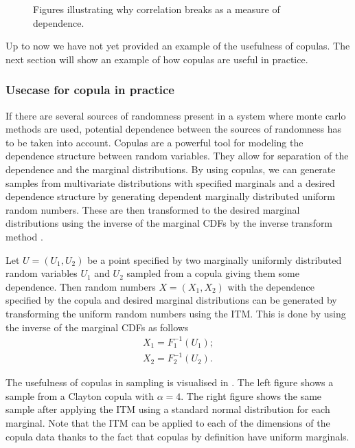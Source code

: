 \begin{figure}
\begin{minipage}{0.25\textwidth}
        \label{fig:exponentialDependenceScatterRet}
    \end{minipage}
    \caption{Figures illustrating why correlation breaks as a measure of dependence.}
    \label{fig:ExamplePlots}
\end{figure}

Up to now we have not yet provided an example of the usefulness of copulas. The next section will show an example of how copulas are useful in practice.

\subsubsection{Usecase for copula in practice}\label{sec:CopulaUseCase}
If there are several sources of randomness present in a system where monte carlo methods are used, potential dependence between the sources of randomness has to be taken into account. Copulas are a powerful tool for modeling the dependence structure between random variables. They allow for separation of the dependence and the marginal distributions. By using copulas, we can generate samples from multivariate distributions with specified marginals and a desired dependence structure by generating dependent marginally distributed uniform random numbers. These are then transformed to the desired marginal distributions using the inverse of the marginal \gls{CDF}s by the inverse transform method .

Let $U = (U_1,U_2)$ be a point specified by two marginally uniformly distributed random variables $U_1$ and $U_2$ sampled from a copula giving them some dependence. Then random numbers $X = (X_1,X_2)$ with the dependence specified by the copula and desired marginal distributions can be generated by transforming the uniform random numbers using the \gls{ITM}. This is done by using the inverse of the marginal \gls{CDF}s as follows
\begin{align*}
    X_1 = F_1^{-1}(U_1); \\
    X_2 = F_2^{-1}(U_2).
\end{align*}

The usefulness of copulas in sampling is visualised in . The left figure shows a sample from a Clayton copula with $\alpha = 4$. The right figure shows the same sample after applying the \gls{ITM} using a standard normal distribution for each marginal. Note that the \gls{ITM} can be applied to each of the dimensions of the copula data thanks to the fact that copulas by definition have uniform marginals. 

